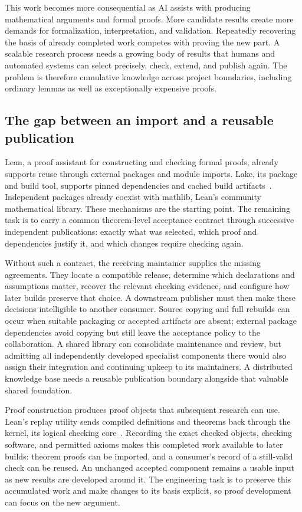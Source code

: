 \documentclass[11pt]{article}
\begin{document}
This work becomes more consequential as AI assists with producing mathematical
arguments and formal proofs. More candidate results create more demands for
formalization, interpretation, and validation. Repeatedly recovering the basis
of already completed work competes with proving the new part. A scalable
research process needs a growing body of results that humans and automated
systems can select precisely, check, extend, and publish again. The problem is
therefore cumulative knowledge across project boundaries, including ordinary
lemmas as well as exceptionally expensive proofs.

\subsection{The gap between an import and a reusable publication}

Lean, a proof assistant for constructing and checking formal proofs, already
supports reuse through external packages and module imports.
Lake, its package and build tool, supports pinned dependencies and cached build
artifacts~\citep{lake}. Independent packages already coexist with mathlib,
Lean's community mathematical library. These mechanisms are the starting point. The
remaining task is to carry a common theorem-level acceptance contract through
successive independent publications: exactly what was selected, which proof
and dependencies justify it, and which changes require checking again.

Without such a contract, the receiving maintainer supplies the missing
agreements. They locate a compatible release, determine which declarations
and assumptions matter, recover the relevant checking evidence, and configure
how later builds preserve that choice. A downstream publisher must then make
these decisions intelligible to another consumer. Source copying and full
rebuilds can occur when suitable packaging or accepted artifacts are absent;
external package dependencies avoid copying but still leave the acceptance
policy to the collaboration. A shared library can consolidate maintenance and
review, but admitting all independently developed specialist components there
would also assign their integration and continuing upkeep to its maintainers.
A distributed knowledge base needs a reusable publication boundary alongside
that valuable shared foundation.

Proof construction produces proof objects that subsequent research can use.
Lean's replay utility sends compiled definitions and theorems back through
the kernel, its logical checking core~\citep{leanreplay}. Recording the exact checked objects, checking software, and permitted axioms
makes this completed work available to later builds: theorem proofs can be
imported, and a consumer's record of a still-valid check can be reused.
An unchanged accepted component remains a usable input as new results are
developed around it. The engineering task is to preserve this accumulated work
and make changes to its basis explicit, so proof development can focus on the
new argument.
\end{document}
